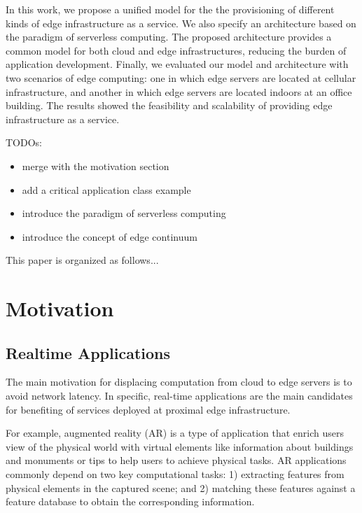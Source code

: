 In this work, we propose a unified model for the the provisioning of different kinds of edge infrastructure as a service. We also specify an architecture based on the paradigm of serverless computing. The proposed architecture provides a common model for both cloud and edge infrastructures, reducing the burden of application development. Finally, we evaluated our model and architecture with two scenarios of edge computing: one in which edge servers are located at cellular infrastructure, and another in which edge servers are located indoors at an office building. The results showed the feasibility and scalability of providing edge infrastructure as a service.

TODOs: 
\begin{itemize}

\item merge with the motivation section
\item add a critical application class example
\item introduce the paradigm of serverless computing
\item introduce the concept of edge continuum

\end{itemize}

This paper is organized as follows...


\section{Motivation}

\subsection{Realtime Applications}

The main motivation for displacing computation from cloud to edge servers is to avoid network latency. In specific, real-time applications are the main candidates for benefiting of services deployed at proximal edge infrastructure.

For example, augmented reality (AR) is a type of application that enrich users view of the physical world with virtual elements like information about buildings and monuments or tips to help users to achieve physical tasks. AR applications commonly depend on two key computational tasks: 1) extracting features from physical elements in the captured scene; and 2) matching these features against a feature database to obtain the corresponding information. 


